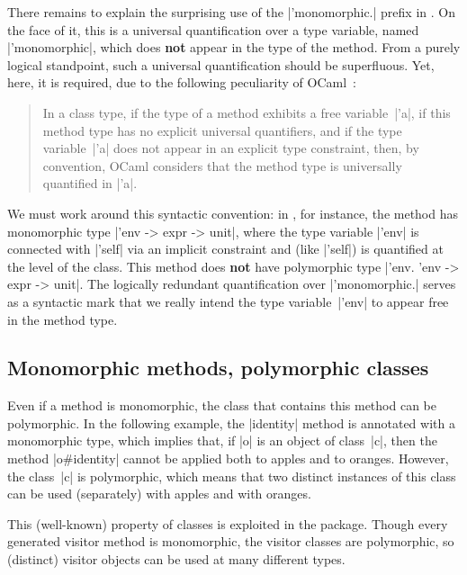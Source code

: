 \documentclass[11pt,a4paper,twoside]{article}
\renewcommand{\emph}[1]{\textbf{#1}}
\begin{document}
There remains to explain the surprising use of the \oc|'monomorphic.| prefix
in . On the face of it, this is a universal
quantification over a type variable, named \oc|'monomorphic|, which does
\emph{not} appear in the type of the method. From a purely logical standpoint,
such a universal quantification should be superfluous. Yet, here, it is
required, due to the following peculiarity of OCaml~\cite{ocaml7465}:
\begin{quote}
  In a class type,
  if the type of a method exhibits a free variable~\oc|'a|,
  if this method type has no explicit universal quantifiers,
  and if the type variable~\oc|'a| does not appear in an explicit type constraint,
  then, by convention,
  OCaml considers that the method type is universally quantified in \oc|'a|.
\end{quote}
We must work around this syntactic convention: in , for
instance, the method  has monomorphic type %
\oc|'env -> expr -> unit|, where the type variable \oc|'env| is connected with
\oc|'self| via an implicit constraint and (like \oc|'self|) is quantified at
the level of the class. This method does \emph{not} have polymorphic type %
\oc|'env. 'env -> expr -> unit|. The logically redundant quantification over
\oc|'monomorphic.| serves as a syntactic mark that we really intend the type
variable~\oc|'env| to appear free in the method type.


\subsection{Monomorphic methods, polymorphic classes}

Even if a method is monomorphic, the class that contains this method can be
polymorphic. In the following example, the \oc|identity| method is annotated
with a monomorphic type, which implies that, if \oc|o| is an object of
class~\oc|c|, then the method \oc|o#identity| cannot be applied both to apples
and to oranges. However, the class~\oc|c| is polymorphic, which means that two
distinct instances of this class can be used (separately) with apples and with
oranges.
\begin{origenv}

\end{origenv}
This (well-known) property of classes is exploited in the \visitors package.
Though every generated visitor method is monomorphic, the visitor classes are
polymorphic, so (distinct) visitor objects can be used at many different
types.
\end{document}
